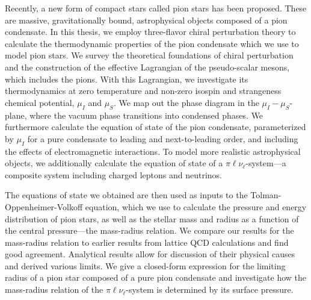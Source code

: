 \vspace*{.5cm}
Recently, a new form of compact stars called pion stars has been proposed.
These are massive, gravitationally bound, astrophysical objects composed of a pion condensate.
In this thesis, we employ three-flavor chiral perturbation theory to calculate the thermodynamic properties of the pion condensate which we use to model pion stars.
We survey the theoretical foundations of chiral perturbation and the construction of the effective Lagrangian of the pseudo-scalar mesons, which includes the pions.
With this Lagrangian, we investigate its thermodynamics at zero temperature and non-zero isospin and strangeness chemical potential, $\mu_I$ and $\mu_S$.
We map out the phase diagram in the $\mu_I-\mu_S$-plane, where the vacuum phase transitions into condensed phases.
We furthermore calculate the equation of state of the pion condensate, parameterized by $\mu_I$ for a pure condensate to leading and next-to-leading order, and including the effects of electromagnetic interactions.
To model more realistic astrophysical objects, we additionally calculate the equation of state of a $\pi\ell\nu_\ell$-system---a composite system including charged leptons and neutrinos.


The equations of state we obtained are then used as inputs to the Tolman-Oppenheimer-Volkoff equation, which we use to calculate the pressure and energy distribution of pion stars, as well as the stellar mass and radius as a function of the central pressure---the mass-radius relation.
We compare our results for the mass-radius relation to earlier results from lattice QCD calculations and find good agreement.
Analytical results allow for discussion of their physical causes and derived various limits.
We give a closed-form expression for the limiting radius of a pion star composed of a pure pion condensate and investigate how the mass-radius relation of the $\pi\ell\nu_\ell$-system is determined by its surface pressure.



